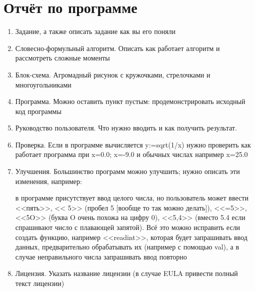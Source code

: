 \documentclass[unicode, 12pt, a4paper,oneside,fleqn]{article}
\begin{document}
\section{Отчёт по программе}
\begin{enumerate}
\item Задание, а также описать задание как вы его поняли
\item Словесно-формульный алгоритм. Описать как работает алгоритм и
  рассмотреть сложные моменты
\item Блок-схема. Агромадный рисунок с кружочками, стрелочками и
  многоугольниками
\item Программа. Можно оставить пункт пустым: продемонстрировать
  исходный код программы
\item Руководство пользователя. Что нужно вводить и как получить
  результат.
\item Проверка. Если в программе вычисляется y:=sqrt(1/x) нужно
  проверить как работает программа при x=0.0; x=-9.0 и обычных числах например x=25.0
\item Улучшения. Большинство программ можно улучшить; нужно
  описать эти изменения, например:

  в программе присутствует ввод целого числа,
  но пользователь может ввести
  <<пять>>,
  << 5>> (пробел 5 [вообще то так можно делать]),
  <<=5>>,
  <<5O>> (буква O очень похожа на цифру 0),
  <<5,4>> (вместо 5.4 если спрашивают число с плавающей запятой).
  Всё это можно исправить если создать функцию, например <<readint>>,
  которая будет запрашивать ввод данных, предварительно обрабатывать
  их (например с помощью val), а в случае неправильного числа
  запрашивать ввод повторно
\item Лицензия. Указать название лицензии (в случае EULA привести
  полный текст лицензии)


\end{enumerate}
\end{document}
